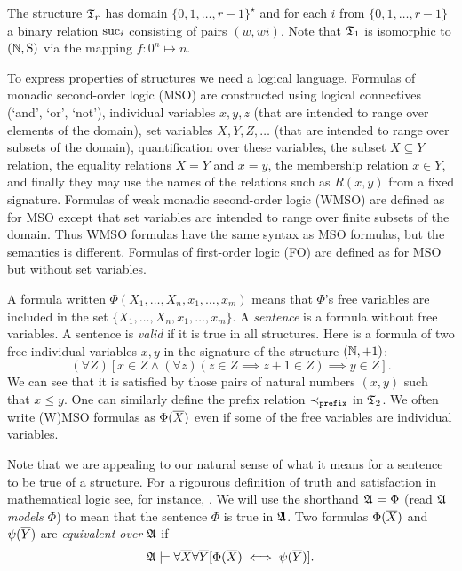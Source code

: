 \begin{example}
The structure  $\mathfrak{T}_r$ has domain $\{0,1, \dots,r-1\}^\star$ and for each  $i$ from $\{0,1, \dots, r-1\}$ a binary relation $\text{suc}_i$ consisting of pairs $(w,wi)$. 
Note that $\mathfrak{T}_1$ is isomorphic to $\mbox{$(\mathbb{N},\mathrm{S})$}$ via the mapping $f:0^n \mapsto n$.
\end{example}

To express properties of structures we need a logical language. Formulas of monadic
second-order logic (MSO) are constructed using logical connectives (`and',
`or', `not'), individual variables $x,y,z$ (that are intended to range over
elements of the domain), set variables $X,Y,Z,\dots$ (that are intended to
range over subsets of the domain), quantification over these variables, the
subset $X \subseteq Y$ relation, the equality relations $X = Y$ and $x=y$, the membership relation $x \in Y$, 
and finally they may
use the names of the relations such as $R(x,y)$ from a fixed signature. 
Formulas of weak monadic second-order logic (WMSO) are defined as for MSO
except that set variables are intended to range over finite subsets of the
domain. Thus WMSO formulas have the same syntax as MSO formulas, but the semantics is different.
Formulas of first-order logic (FO) are defined as for MSO but without 
set variables. 

A formula written $\Phi(X_1,\dots,X_n,x_1,\dots,x_m)$ means that $\Phi$'s
free variables are included in the set $\{X_1,\dots,X_n,x_1,\dots,x_m\}$.
A {\em sentence} is a formula without free variables. A sentence is {\em valid} if it is true in all structures.
Here is a formula of two free individual variables $x,y$ in the signature of the structure $(\mathbb{N},+1)$:
\[
(\forall Z) [x \in Z \wedge (\forall z)(z \in Z \implies z+1 \in Z) \implies y \in Z].
\]
We can see that it is satisfied by those pairs of natural numbers $(x,y)$ such that $x \leq y$. 
One can similarly define the prefix relation $\prec_{\tt prefix}$ in $\mathfrak{T}_2$. We often write (W)MSO formulas as $\Phi(\mbox{$\overline {X}$})$ even if some of the free
variables are individual variables.

Note that we are appealing to our natural sense of what it means for a sentence to be true of a structure. 
For a rigourous definition of truth and satisfaction in
mathematical logic see, for instance, \cite{Bool07}. We will use the shorthand $\mathfrak{A} \models \Phi$
(read \emph{$\mathfrak{A}$ models $\Phi$}) to mean that the sentence $\Phi$ is true in
$\mathfrak{A}$. Two formulas $\Phi(\mbox{$\overline {X}$})$ and $\psi(\mbox{$\overline {Y}$})$ are {\em equivalent over $\mathfrak{A}$}
if \[\mathfrak{A} \models \forall \mbox{$\overline {X}$} \forall \mbox{$\overline {Y}$} [\Phi(\mbox{$\overline {X}$}) \iff \psi(\mbox{$\overline {Y}$})].\]

